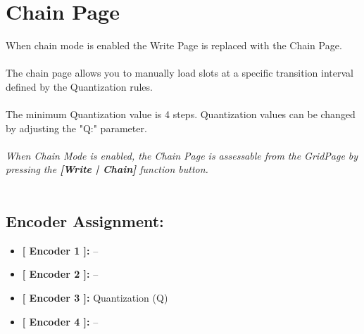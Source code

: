 \chapter{Chain Page}
When chain mode is enabled the Write Page is replaced with the Chain Page.\\
\\
The chain page allows you to manually load slots at a specific transition interval defined by the Quantization rules.\\
\\
The minimum Quantization value is 4 steps. Quantization values can be changed by adjusting the "Q:" parameter.
\\\\
\textit{When Chain Mode is enabled, the Chain Page is assessable from the GridPage by pressing the  \textbf{[Write | Chain]} function button.}
\\\\
\section{Encoder Assignment:}

\begin{itemize}
	\item \textbf{[ Encoder 1 ]: } --
	\item \textbf{[ Encoder 2 ]: } --
	\item \textbf{[ Encoder 3 ]: } Quantization (Q)
	\item \textbf{[ Encoder 4 ]: }--
\end{itemize}
